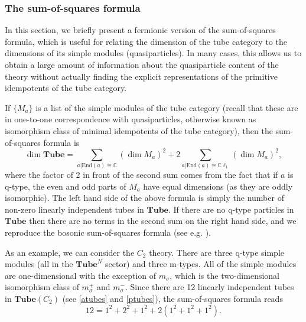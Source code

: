 \documentclass[12pt,a4paper]{article}
\newcommand{\cc}{\mathbb{C}}
\newcommand\be            {\begin{equation}}
\newcommand\ee            {\end{equation}}
\newcommand{\End}{\text{End}}
\newcommand{\cl}{\mathbb{C}\ell}
\newcommand{\tube}{\textbf{Tube}}
\begin{document}


\subsubsection{The sum-of-squares formula}

In this section, we briefly present a fermionic version of the sum-of-squares formula, which is useful for relating the dimension
of the tube category to the dimensions of its simple modules (quasiparticles). 
In many cases, this allows us to obtain a large amount of information about the quasiparticle 
content of the theory without actually finding the explicit representations of the primitive 
idempotents of the tube category.

If $\{M_a\}$ is a list of the simple modules of the tube category 
(recall that these are in one-to-one correspondence with quasiparticles, otherwise known as isomorphism class of minimal idempotents of the tube category), then 
the sum-of-squares formula is
\be \label{sumofsqs} \dim \tube = \sum_{a | \End(a) \cong \cc} (\dim M_a)^2 + 2\sum_{a|\End(a) \cong \cl_1} (\dim M_a)^2,\ee
where the factor of 2 in front of the second sum comes from the fact that if $a$ is q-type, 
the even and odd parts of $M_a$ have equal dimensions (as they are oddly isomorphic). 
The left hand side of the above formula is simply the number of non-zero linearly independent tubes in $\tube$. 
If there are no q-type particles in $\tube$ then there are no terms in the second sum on the right hand side, 
and we reproduce the bosonic sum-of-squares formula (see e.g. \cite{Lan2014}). 

As an example, we can consider the $C_2$ theory. 
There are three q-type simple modules (all in the $\tube^N$ sector) and three m-types. 
All of the simple modules are one-dimensional with the exception of $m_\sigma$, 
which is the two-dimensional isomorphism class of $m_\sigma^+$ and $m_\sigma^-$. 
Since there are 12 linearly independent tubes in $\tube(C_2)$ (see \eqref{atubes} and \eqref{ptubes}), 
the sum-of-squares formula reads
\be 12 = 1^2+2^2+1^2+2(1^2+1^2+1^2).\ee
\end{document}
